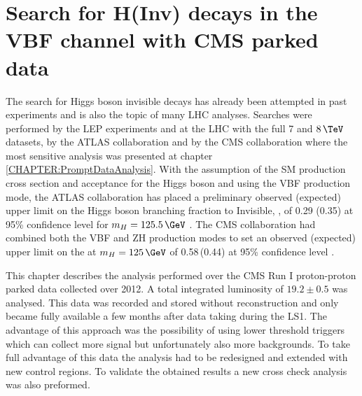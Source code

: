 \chapter{Search for H(Inv) decays in the VBF channel with CMS parked data}
\label{CHAPTER:ParkedDataAnalysis}

\glsresetall %



The search for Higgs boson invisible decays has already been attempted in past experiments and is also the topic of many \gls{LHC} analyses. Searches were performed by the \gls{LEP} experiments \cite{ARTICLE:LEPSearchesForInvisibleHiggsBosons,ARTICLE:LEPDELPHISearchesForInvisibleDecayingHiggsBosons,ARTICLE:LEPOPALSearchForInvisiblyDecayingHiggsBosons} and at the \gls{LHC} with the full 7 and $8\,\TeV$ datasets, by the \gls{ATLAS} collaboration \cite{ARTICLE:ATLASSearchForInvisibleDecaysHiggsBosonAssociatedZ,ARTICLE:ATLASSearchForDarkMatterWithHadronicallyWorZ,ARTICLE:ATLASMonoJetPlusMET,ARTICLE:ATLASVBFHiggsInvConfNote} and by the \gls{CMS} collaboration \cite{ARTICLE:CMSVBFHiggsToInvAndZHCombination} where the most sensitive analysis was presented at chapter \ref{CHAPTER:PromptDataAnalysis}. With the assumption of the \gls{SM} production cross section and acceptance for the Higgs boson and using the \gls{VBF} production mode, the \gls{ATLAS} collaboration has placed a preliminary observed (expected) upper limit on the Higgs boson branching fraction to Invisible, \BRinv, of 0.29 (0.35) at 95\% confidence level for $m_H=125.5\,\GeV$ \cite{ARTICLE:ATLASVBFHiggsInvConfNote}. The \gls{CMS} collaboration had combined both the \gls{VBF} and ZH production modes to set an observed (expected) upper limit on the \BRinv at  $m_H=125\,\GeV$ of 0.58\,(0.44) at 95\% confidence level \cite{ARTICLE:CMSVBFHiggsToInvAndZHCombination}.

This chapter describes the analysis performed over the \gls{CMS} Run I proton-proton parked data collected over 2012. A total integrated luminosity of $19.2 \pm 0.5$ was analysed. This data was recorded and stored without reconstruction and only became fully available a few months after data taking during the \gls{LS1}. The advantage of this approach was the possibility of using lower threshold triggers which can collect more signal but unfortunately also more backgrounds. To take full advantage of this data the analysis had to be redesigned and extended with new control regions. To validate the obtained results a new cross check analysis was also preformed.


